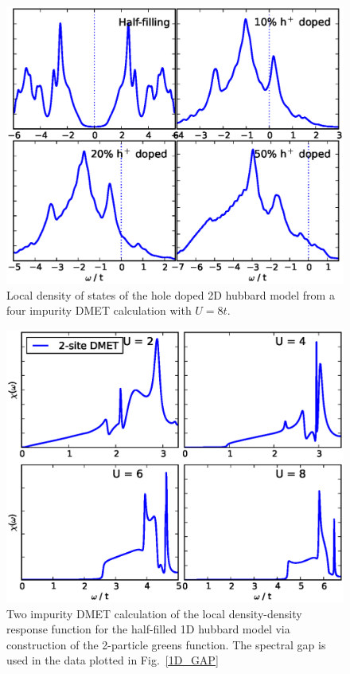 \documentclass[aps,showpacs,twocolumn,nobibnotes]{revtex4}
\begin{document}
\begin{figure}
\begin{center}
\includegraphics[scale=0.475]{Plots/Doping/2D/nImp4/U8/2DHub_Doping.eps}
\end{center}
\caption{Local density of states of the hole doped 2D hubbard model from a four impurity DMET calculation with $U = 8t$.}
\label{2D_Doped}
\end{figure}

\begin{figure}
\begin{center}
\includegraphics[scale=0.475]{Plots/1D_DD/1D_Hub_DD.eps}
\end{center}
\caption{Two impurity DMET calculation of the local density-density response function for the half-filled 1D hubbard model via construction of the 2-particle greens function.
The spectral gap is used in the data plotted in Fig.~\ref{1D_GAP}}
\label{1D_DD}
\end{figure}




\end{document}
